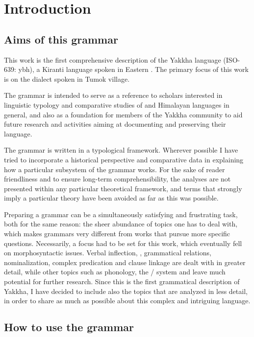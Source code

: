 ﻿\chapter{Introduction}\label{grammar-intro}

\section{Aims of this grammar}

This work is the first comprehensive description of the Yakkha language  (ISO-639: ybh), a Kiranti language spoken in Eastern . The primary focus of this work is on the dialect spoken in Tumok village. 

The grammar is intended to serve as a reference to scholars interested in linguistic typology and comparative studies of  and Himalayan languages in general, and also as a foundation for members of the Yakkha community to aid future research and activities aiming at documenting and preserving their language. 

The grammar is written in a typological framework.  Wherever possible I have tried to incorporate a historical perspective and comparative data in explaining how a particular subsystem of the grammar works. For the sake of reader friendliness and to ensure long-term comprehensibility, the analyses are not presented within any particular theoretical framework, and terms that strongly imply a particular theory have been avoided as far as this was possible.  

Preparing a grammar can be a simultaneously  satisfying and frustrating task, both for the same reason: the sheer abundance of topics one has to deal with, which makes grammars very different from works that pursue more specific questions. Necessarily, a focus had to be set for this work, which eventually fell on morphosyntactic issues. Verbal inflection, , grammatical relations, nominalization, complex predication and clause linkage are dealt with in greater detail, while other topics such as phonology, the / system and  leave much potential for further research. Since this is the first grammatical description of Yakkha, I have decided to include also the topics that are analyzed in less detail, in order to share as much as possible about this complex and intriguing language.


\section{How to use the grammar}\label{how-to}
